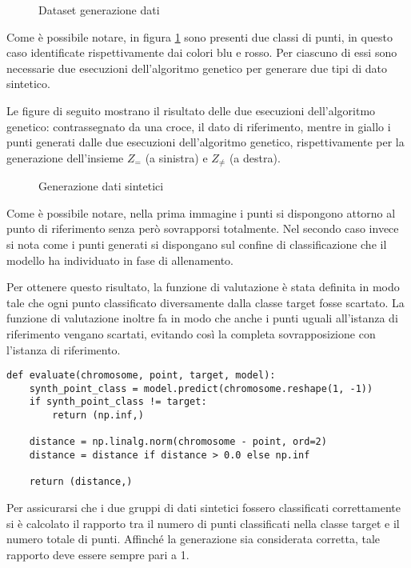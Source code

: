 \begin{figure}[H]
	\centering
	
	\caption{Dataset generazione dati}
	\label{fig: xai_test}
\end{figure}

Come è possibile notare, in figura \ref{fig: xai_test} sono presenti due classi
di punti, in questo caso identificate rispettivamente dai colori blu e rosso.
Per ciascuno di essi sono necessarie due esecuzioni dell'algoritmo genetico per
generare due tipi di dato sintetico.

Le figure di seguito mostrano il risultato delle due esecuzioni dell'algoritmo
genetico: contrassegnato da una croce, il dato di riferimento, mentre in giallo
i punti generati dalle due esecuzioni dell'algoritmo genetico, rispettivamente
per la generazione dell'insieme $Z_=$ (a sinistra) e $Z_{\neq}$ (a destra).

\begin{figure}[H]
	\centering
	
	\caption{Generazione dati sintetici}
	\label{fig: synth_points}
\end{figure}

Come è possibile notare, nella prima immagine i punti si dispongono attorno al
punto di riferimento senza però sovrapporsi totalmente. Nel secondo caso invece
si nota come i punti generati si dispongano sul confine di classificazione che
il modello ha individuato in fase di allenamento.

Per ottenere questo risultato, la funzione di valutazione è stata definita in
modo tale che ogni punto classificato diversamente dalla classe target fosse
scartato. La funzione di valutazione inoltre fa in modo che anche i punti uguali
all'istanza di riferimento vengano scartati, evitando così la completa
sovrapposizione con l'istanza di riferimento.

\begin{lstlisting}[caption={Funzione di valutazione}]
def evaluate(chromosome, point, target, model):
	synth_point_class = model.predict(chromosome.reshape(1, -1))
	if synth_point_class != target:
		return (np.inf,)

	distance = np.linalg.norm(chromosome - point, ord=2)
	distance = distance if distance > 0.0 else np.inf

	return (distance,)
\end{lstlisting}

Per assicurarsi che i due gruppi di dati sintetici fossero classificati
correttamente si è calcolato il rapporto tra il numero di punti classificati
nella classe target e il numero totale di punti. Affinché la generazione sia
considerata corretta, tale rapporto deve essere sempre pari a 1.
